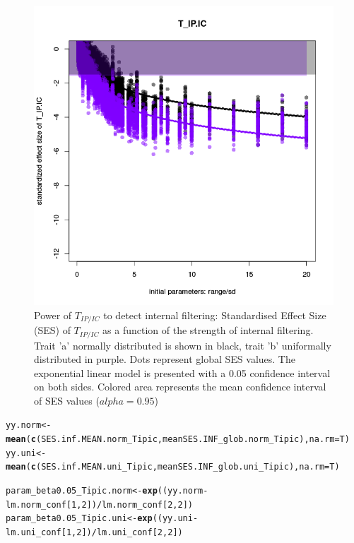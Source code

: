 \documentclass[12pt]{article}\usepackage[]{graphicx}\usepackage[]{color}
\makeatletter
\def\maxwidth{ %
  \ifdim\Gin@nat@width>\linewidth
    \linewidth
  \else
    \Gin@nat@width
  \fi
}
\newcommand{\hlnum}[1]{\textcolor[rgb]{0.686,0.059,0.569}{#1}}%
\newcommand{\hlopt}[1]{\textcolor[rgb]{0,0,0}{#1}}%
\newcommand{\hlstd}[1]{\textcolor[rgb]{0.345,0.345,0.345}{#1}}%
\newcommand{\hlkwb}[1]{\textcolor[rgb]{0.69,0.353,0.396}{#1}}%
\newcommand{\hlkwc}[1]{\textcolor[rgb]{0.333,0.667,0.333}{#1}}%
\newcommand{\hlkwd}[1]{\textcolor[rgb]{0.737,0.353,0.396}{\textbf{#1}}}%
\newenvironment{kframe}{%
 \def\at@end@of@kframe{}%
 \ifinner\ifhmode%
  \def\at@end@of@kframe{\end{minipage}}%
  \begin{minipage}{\columnwidth}%
 \fi\fi%
 \def\FrameCommand##1{\hskip\@totalleftmargin \hskip-\fboxsep
 \colorbox{shadecolor}{##1}\hskip-\fboxsep
     \hskip-\linewidth \hskip-\@totalleftmargin \hskip\columnwidth}%
 \MakeFramed {\advance\hsize-\width
   \@totalleftmargin\z@ \linewidth\hsize
   \@setminipage}}%
 {\par\unskip\endMakeFramed%
 \at@end@of@kframe}
\newenvironment{knitrout}{}{} %
\makeatother
\begin{document}
\begin{knitrout}
\begin{figure}
{\centering \includegraphics[width=\maxwidth]{figure/In_conc_plot-1} 

}

\caption[Power of $T_{IP/IC}$ to detect internal filtering]{Power of $T_{IP/IC}$ to detect internal filtering: Standardised Effect Size (SES) of $T_{IP/IC}$ as a function of the strength of internal filtering. Trait 'a' normally distributed is shown in black, trait 'b' uniformally distributed in purple. Dots represent global SES values. The exponential linear model is presented with a 0.05 confidence interval on both sides. Colored area represents the mean confidence interval of SES values ($alpha = 0.95$)}\label{fig:In_conc_plot}
\end{figure}


\end{knitrout}

\begin{knitrout}\small
{}\color{fgcolor}\begin{kframe}
\begin{alltt}
\hlstd{yy.norm} \hlkwb{<-} \hlkwd{mean}\hlstd{(}\hlkwd{c}\hlstd{(SES.inf.MEAN.norm_Tipic, meanSES.INF_glob.norm_Tipic),} \hlkwc{na.rm} \hlstd{= T)}
\hlstd{yy.uni} \hlkwb{<-} \hlkwd{mean}\hlstd{(}\hlkwd{c}\hlstd{(SES.inf.MEAN.uni_Tipic, meanSES.INF_glob.uni_Tipic),} \hlkwc{na.rm} \hlstd{= T)}

\hlstd{param_beta0.05_Tipic.norm} \hlkwb{<-} \hlkwd{exp}\hlstd{((yy.norm} \hlopt{-} \hlstd{lm.norm_conf [}\hlnum{1}\hlstd{,} \hlnum{2}\hlstd{])} \hlopt{/} \hlstd{lm.norm_conf [}\hlnum{2}\hlstd{,} \hlnum{2}\hlstd{])}
\hlstd{param_beta0.05_Tipic.uni} \hlkwb{<-} \hlkwd{exp}\hlstd{((yy.uni} \hlopt{-} \hlstd{lm.uni_conf [}\hlnum{1}\hlstd{,} \hlnum{2}\hlstd{])} \hlopt{/} \hlstd{lm.uni_conf [}\hlnum{2}\hlstd{,} \hlnum{2}\hlstd{])}
\end{alltt}
\end{kframe}
\end{knitrout}
\end{document}
